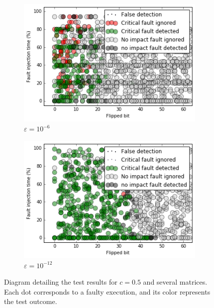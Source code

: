 \begin{figure}[h]
\begin{minipage}[b]{0.48\linewidth}
	\begin{subfigure}[t]{\linewidth}
		\centering
		\includegraphics[width=1.1\linewidth]{figures/test_result_c05_0_precond.png}
		\caption{$\varepsilon = 10^{-6}$}\label{fig:test_result_c05_0_precond}	
	\end{subfigure}
    \quad
    \begin{subfigure}[t]{\linewidth}
		\centering
		\includegraphics[width=1.1\linewidth]{figures/test_result_c05_1_precond.png}
		\caption{$\varepsilon = 10^{-12}$}\label{fig:test_result_c05_1_precond}	
	\end{subfigure}

	\end{minipage}
\caption{Diagram detailing the test results for $c = 0.5$ and several matrices. Each dot corresponds to a faulty execution, and its color represents the test outcome.}
\label{fig:test_result_c05_matrices}
\end{figure}





